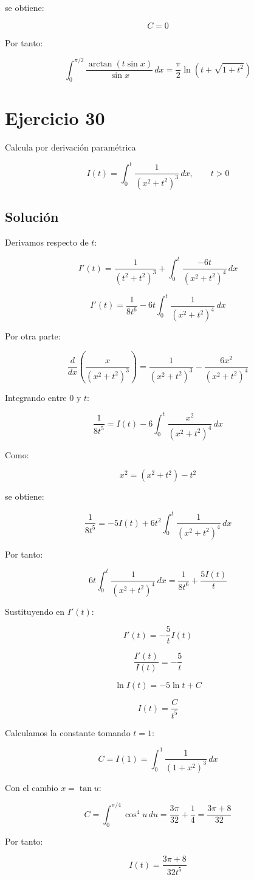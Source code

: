 \documentclass[fleqn]{article}
\begin{document}
	se obtiene:

	\[
	C=0
	\]

	Por tanto:

	\[
	\boxed{
	\int_0^{\pi/2}
	\frac{\arctan(t\sin x)}{\sin x}\,dx
	=
	\frac{\pi}{2}
	\ln\left(t+\sqrt{1+t^2}\right)
	}
	\]

\section{Ejercicio 30}
	Calcula por derivación paramétrica

	\[
	I(t)=\int_0^t\frac{1}{(x^2+t^2)^3}\,dx,
	\qquad t>0
	\]

	\subsection{Solución}

	Derivamos respecto de $t$:

	\[
	I'(t)
	=
	\frac{1}{(t^2+t^2)^3}
	+
	\int_0^t
	\frac{-6t}{(x^2+t^2)^4}\,dx
	\]

	\[
	I'(t)
	=
	\frac{1}{8t^6}
	-
	6t\int_0^t\frac{1}{(x^2+t^2)^4}\,dx
	\]

	Por otra parte:

	\[
	\frac{d}{dx}
	\left(
	\frac{x}{(x^2+t^2)^3}
	\right)
	=
	\frac{1}{(x^2+t^2)^3}
	-
	\frac{6x^2}{(x^2+t^2)^4}
	\]

	Integrando entre $0$ y $t$:

	\[
	\frac{1}{8t^5}
	=
	I(t)
	-
	6\int_0^t
	\frac{x^2}{(x^2+t^2)^4}\,dx
	\]

	Como:

	\[
	x^2=(x^2+t^2)-t^2
	\]

	se obtiene:

	\[
	\frac{1}{8t^5}
	=
	-5I(t)
	+
	6t^2\int_0^t
	\frac{1}{(x^2+t^2)^4}\,dx
	\]

	Por tanto:

	\[
	6t\int_0^t
	\frac{1}{(x^2+t^2)^4}\,dx
	=
	\frac{1}{8t^6}
	+
	\frac{5I(t)}{t}
	\]

	Sustituyendo en $I'(t)$:

	\[
	I'(t)
	=
	-\frac{5}{t}I(t)
	\]

	\[
	\frac{I'(t)}{I(t)}
	=
	-\frac{5}{t}
	\]

	\[
	\ln I(t)
	=
	-5\ln t+C
	\]

	\[
	I(t)=\frac{C}{t^5}
	\]

	Calculamos la constante tomando $t=1$:

	\[
	C=I(1)
	=
	\int_0^1\frac{1}{(1+x^2)^3}\,dx
	\]

	Con el cambio $x=\tan u$:

	\[
	C
	=
	\int_0^{\pi/4}\cos^4u\,du
	=
	\frac{3\pi}{32}+\frac{1}{4}
	=
	\frac{3\pi+8}{32}
	\]

	Por tanto:

	\[
	\boxed{
	I(t)
	=
	\frac{3\pi+8}{32t^5}
	}
	\]
\end{document}

